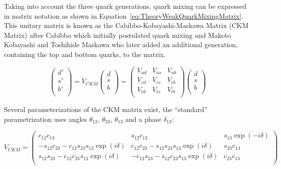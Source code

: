 Taking into account the three quark generations, quark mixing can be expressed in matrix notation as shown in Equation~\ref{eq:TheoryWeakQuarkMixingMatrix}. This unitary matrix is known as the Cabibbo-Kobayashi-Maskawa Matrix (CKM Matrix) after Cabibbo which initially postulated quark mixing and Makoto Kobayashi and Toshihide Maskawa who later added an additional generation, containing the top and bottom quarks, to the matrix\cite{Theory:CKMKobayashiMaskawa}.

\begin{equation}
\label{eq:TheoryWeakQuarkMixingMatrix}
\begin{pmatrix}
  d' \\
  s' \\
  b' \\
\end{pmatrix}
=
V_{CKM}
\begin{pmatrix}
  d \\
  s \\
  b \\
\end{pmatrix}
=
\begin{pmatrix}
  V_{ud} & V_{us} & V_{ub} \\
  V_{cd} & V_{cs} & V_{cb} \\
  V_{td} & V_{ts} & V_{tb} \\
\end{pmatrix}
\begin{pmatrix}
  d \\
  s \\
  b \\
\end{pmatrix}
\end{equation}

Several parameterizations of the CKM matrix exist, the ``standard'' parametrization uses angles $\theta_{\textrm{12}}$, $\theta_{\textrm{23}}$, $\theta_{\textrm{13}}$ and a phase $\delta_{\textrm{13}}$:

\begin{equation}
\label{eq:TheoryWeakCKMStandard}
V_{CKM}
=
\begin{pmatrix}
c_{12}c_{13} & s_{12}c_{13} & s_{13}\exp(-i\delta) \\
-s_{12}c_{23}-c_{12}s_{23}s_{13}\exp(i\delta) & c_{12}c_{23} - s_{12}s_{23}s_{13}\exp(i\delta) & s_{23}c_{13} \\ 
s_{12}s_{23}- c_{12}c_{23}s_{13}\exp(i\delta) & -c_{12}s_{23}-s_{12}c_{23}s_{13}\exp(i\delta) & c_{23}c_{13} \\
\end{pmatrix}
\end{equation}

